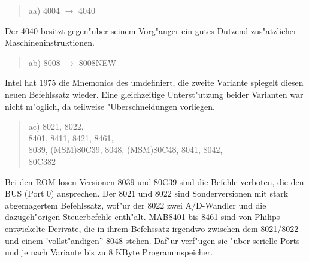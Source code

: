 \documentclass[12pt,a4paper,twoside]{report}
\begin{document}
\begin{quote}
aa) 4004 $\rightarrow$ 4040
\end{quote}
Der 4040 besitzt gegen"uber seinem Vorg"anger ein gutes Dutzend
zus"atzlicher Maschineninstruktionen.
\begin{quote}
ab) 8008 $\rightarrow$ 8008NEW
\end{quote}
Intel hat 1975 die Mnemonics des umdefiniert, die zweite Variante spiegelt
diesen neuen Befehlssatz wieder.  Eine gleichzeitige Unterst"utzung beider
Varianten war nicht m"oglich, da teilweise "Uberschneidungen vorliegen.
\begin{quote}
ac) 8021, 8022, \\
    8401, 8411, 8421, 8461, \\
    8039, (MSM)80C39, 8048, (MSM)80C48, 8041, 8042, \\
    80C382
\end{quote}
Bei den ROM-losen Versionen 8039 und 80C39 sind die Befehle verboten,
die den BUS (Port 0) ansprechen.  Der 8021 und 8022 sind Sonderversionen
mit stark abgemagertem Befehlssatz, wof"ur der 8022 zwei A/D-Wandler
und die dazugeh"origen Steuerbefehle enth"alt.  MAB8401 bis 8461 sind von
Philips entwickelte Derivate, die in ihrem Befehssatz irgendwo zwischen
dem 8021/8022 und einem 'vollst"andigen'' 8048 stehen.  Daf"ur verf"ugen
sie "uber serielle Ports und je nach Variante bis zu 8 KByte Programmspeicher.
\end{document}
